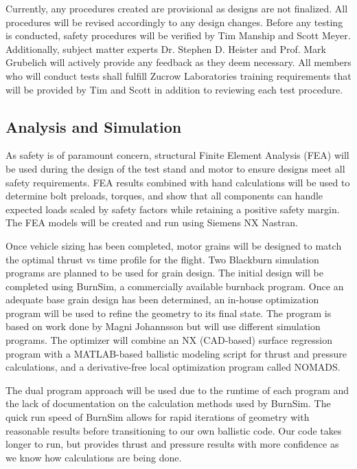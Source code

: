 Currently, any procedures created are provisional as designs are not finalized. All procedures will be revised accordingly to any design changes. Before any testing is conducted, safety procedures will be verified by Tim Manship and Scott Meyer. Additionally, subject matter experts Dr. Stephen D. Heister and Prof. Mark Grubelich will actively provide any feedback as they deem necessary. All members who will conduct tests shall fulfill Zucrow Laboratories training requirements that will be provided by Tim and Scott in addition to reviewing each test procedure.


\subsection{Analysis and Simulation}

As safety is of paramount concern, structural Finite Element Analysis (FEA) will be used during the design of the test stand and motor to ensure designs meet all safety requirements. FEA results combined with hand calculations will be used to determine bolt preloads, torques, and show that all components can handle expected loads scaled by safety factors while retaining a positive safety margin. The FEA models will be created and run using Siemens NX Nastran.

Once vehicle sizing has been completed, motor grains will be designed to match the optimal thrust vs time profile for the flight. Two Blackburn simulation programs are planned to be used for grain design. The initial design will be completed using BurnSim, a commercially available burnback program. Once an adequate base grain design has been determined, an in-house optimization program will be used to refine the geometry to its final state. The program is based on work done by Magni Johannsson \cite{magni} but will use different simulation programs. The optimizer will combine an NX (CAD-based) surface regression program with a MATLAB-based ballistic modeling script for thrust and pressure calculations, and a derivative-free local optimization program called NOMADS. 

The dual program approach will be used due to the runtime of each program and the lack of documentation on the calculation methods used by BurnSim. The quick run speed of BurnSim allows for rapid iterations of geometry with reasonable results before transitioning to our own ballistic code. Our code takes longer to run, but provides thrust and pressure results with more confidence as we know how calculations are being done.


